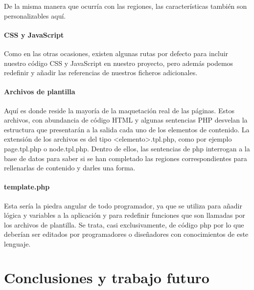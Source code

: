 \par De la misma manera que ocurría con las regiones, las características también son personalizables aquí.

\paragraph{CSS y JavaScript}
\par Como en las otras ocasiones, existen algunas rutas por defecto para incluir nuestro código CSS y JavaScript en nuestro proyecto, pero además podemos redefinir y añadir las referencias de nuestros ficheros adicionales.

\paragraph{Archivos de plantilla}
\par Aquí es donde reside la mayoría de la maquetación real de las páginas. Estos archivos, con abundancia de código HTML y algunas sentencias PHP desvelan la estructura que presentarán a la salida cada uno de los elementos de contenido. La extensión de los archivos es del tipo <elemento>.tpl.php, como por ejemplo page.tpl.php o node.tpl.php. Dentro de ellos, las sentencias de php interrogan a la base de datos para saber si se han completado las regiones correspondientes para rellenarlas de contenido y darles una forma.

\paragraph{template.php}
\par Esta sería la piedra angular de todo programador, ya que se utiliza para añadir lógica y variables a la aplicación y para redefinir funciones que son llamadas por los archivos de plantilla. Se trata, casi exclusivamente, de código php por lo que deberían ser editados por programadores o diseñadores con conocimientos de este lenguaje.




\section{Conclusiones y trabajo futuro}


